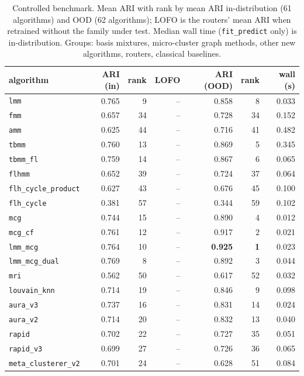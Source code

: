 \documentclass[11pt,a4paper]{article}
\newcommand{\code}[1]{\texttt{#1}}
\begin{document}
\begin{table}[t]
  \centering\small
  \caption{Controlled benchmark. Mean ARI with rank by mean ARI
  in-distribution (61 algorithms) and OOD (62 algorithms); LOFO is the
  routers' mean ARI when retrained without the family under test. Median wall
  time (\code{fit\_predict} only) is in-distribution. Groups: basis mixtures,
  micro-cluster graph methods, other new algorithms, routers, classical
  baselines.}
  \label{tab:final}
  \begin{tabular}{lrrrrrr}
    \toprule
    algorithm & ARI (in) & rank & LOFO & ARI (OOD) & rank & wall (s) \\
    \midrule
    \code{lmm} & 0.765 & 9 & -- & 0.858 & 8 & 0.033 \\
    \code{fmm} & 0.657 & 34 & -- & 0.728 & 34 & 0.152 \\
    \code{amm} & 0.625 & 44 & -- & 0.716 & 41 & 0.482 \\
    \code{tbmm} & 0.760 & 13 & -- & 0.869 & 5 & 0.345 \\
    \code{tbmm\_fl} & 0.759 & 14 & -- & 0.867 & 6 & 0.065 \\
    \code{flhmm} & 0.652 & 39 & -- & 0.724 & 37 & 0.064 \\
    \code{flh\_cycle\_product} & 0.627 & 43 & -- & 0.676 & 45 & 0.100 \\
    \code{flh\_cycle} & 0.381 & 57 & -- & 0.344 & 59 & 0.102 \\
    \midrule
    \code{mcg} & 0.744 & 15 & -- & 0.890 & 4 & 0.012 \\
    \code{mcg\_cf} & 0.761 & 12 & -- & 0.917 & 2 & 0.021 \\
    \code{lmm\_mcg} & 0.764 & 10 & -- & \textbf{0.925} & \textbf{1} & 0.023 \\
    \code{lmm\_mcg\_dual} & 0.769 & 8 & -- & 0.892 & 3 & 0.044 \\
    \midrule
    \code{mri} & 0.562 & 50 & -- & 0.617 & 52 & 0.032 \\
    \code{louvain\_knn} & 0.714 & 19 & -- & 0.846 & 9 & 0.098 \\
    \code{aura\_v3} & 0.737 & 16 & -- & 0.831 & 14 & 0.024 \\
    \code{aura\_v2} & 0.714 & 20 & -- & 0.832 & 13 & 0.040 \\
    \code{rapid} & 0.702 & 22 & -- & 0.727 & 35 & 0.051 \\
    \code{rapid\_v3} & 0.699 & 27 & -- & 0.726 & 36 & 0.065 \\
    \code{meta\_clusterer\_v2} & 0.701 & 24 & -- & 0.628 & 51 & 0.084 \\

\end{tabular}
\end{table}
\end{document}
